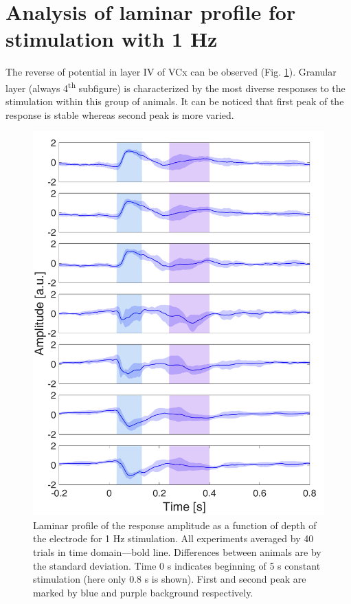\documentclass{pracalicmgr}
\begin{document}
    
    \section{Analysis of laminar profile for stimulation with 1 Hz}
        The reverse of potential in layer IV of VCx can be observed (Fig. \ref{rys:srednie_1Hz_1s}). Granular layer (always 4\textsuperscript{th} subfigure) is characterized by the most diverse responses to the stimulation within this group of animals. It can be noticed that first peak of the response is stable whereas second peak is more varied. 
    \begin{figure}[H]
    	\centering
    	\includegraphics[scale=0.35]{usrednianie_z_tlem.png}
    	\caption{Laminar profile of the response amplitude as a function of depth of the electrode for 1 Hz stimulation. All experiments averaged by 40 trials in time domain---bold line. Differences between animals are by the standard deviation. Time 0 s indicates beginning of 5 s constant stimulation (here only 0.8 s is shown). First and second peak are marked by blue and purple background respectively.}
    	\label{rys:srednie_1Hz_1s}
    \end{figure}
    
\end{document}
